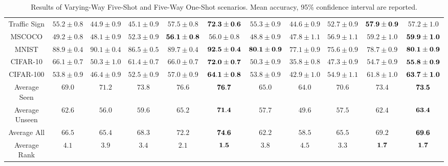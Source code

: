 \begin{table*}[t]
{\begin{tabular}{cccccc|ccccc}
		    \midrule
		    Traffic Sign & $55.2\pm0.8$& $44.9\pm0.9$& $45.1\pm0.9$& $57.5 \pm 0.8$ & ${\bf 72.3 \pm 0.6}$ & $55.3\pm0.9$& $44.6\pm0.9$& $52.7\pm0.9$& ${\bf 57.9 \pm 0.9}$ & $57.2 \pm 1.0$ \\
		    MSCOCO & $49.2\pm0.8$& $48.1\pm0.9$& $52.3\pm0.9$& ${\bf 56.1 \pm 0.8}$ & $56.0 \pm 0.8$ & $48.8\pm0.9$& $47.8\pm1.1$& $56.9\pm1.1$& $59.2 \pm 1.0$ & ${\bf 59.9 \pm 1.0}$ \\
		    MNIST & $88.9\pm0.4$& $90.1\pm0.4$& $86.5\pm0.5$& $89.7 \pm 0.4$ & ${\bf 92.5 \pm 0.4}$  & ${\bf 80.1\pm0.9}$& $77.1\pm0.9$& $75.6\pm0.9$& $78.7 \pm 0.9$ & ${\bf 80.1 \pm 0.9}$ \\
		    CIFAR-10 & $66.1\pm0.7$& $50.3\pm1.0$& $61.4\pm0.7$& $66.0 \pm 0.7$ & ${\bf 72.0 \pm 0.7}$  & $50.3\pm0.9$& $35.8\pm0.8$& $47.3\pm0.9$& $54.7 \pm 0.9$ & ${\bf 55.8 \pm 0.9}$ \\
		    CIFAR-100 & $53.8\pm0.9$& $46.4\pm0.9$& $52.5\pm0.9$& $57.0 \pm 0.9$ & ${\bf 64.1 \pm 0.8}$  & $53.8\pm0.9$& $42.9\pm1.0$& $54.9\pm1.1$& $61.8 \pm 1.0$ & ${\bf 63.7 \pm 1.0}$ \\
		    \midrule
		    Average Seen & $69.0$ & $71.2$ & $73.8$ & $76.6$ & ${\bf 76.7}$ & $65.0$ & $64.0$ & $70.6$ & $73.4$ & ${\bf 73.5}$ \\
		    Average Unseen & $62.6$ & $56.0$ & $59.6$ & $65.2$ & ${\bf 71.4}$ & $57.7$ & $49.6$ & $57.5$ & $62.4$ & ${\bf 63.4}$ \\
		    Average All & $66.5$ & $65.4$ & $68.3$ & $72.2$ & ${\bf 74.6}$ & $62.2$ & $58.5$ & $65.5$ & $69.2$ & ${\bf 69.6}$ \\
		    \midrule
		    Average Rank & $4.1$ & $3.9$ & $3.4$ & $2.1$ & ${\bf 1.5}$ & $3.8$ & $4.5$ & $3.3$ & ${\bf 1.7}$ & ${\bf 1.7}$ \\
			\bottomrule
		\end{tabular}%
			}
		\vspace{-0.25cm}
		\caption{Results of Varying-Way Five-Shot and Five-Way One-Shot scenarios. Mean accuracy, 95\% confidence interval are reported.}
		\label{supptab:fixedshot}
\end{table*}%

